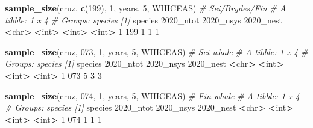 \documentclass[
]{book}
\newenvironment{Shaded}{\begin{snugshade}}{\end{snugshade}}
\newcommand{\AttributeTok}[1]{\textcolor[rgb]{0.13,0.29,0.53}{#1}}
\newcommand{\CommentTok}[1]{\textcolor[rgb]{0.56,0.35,0.01}{\textit{#1}}}
\newcommand{\DecValTok}[1]{\textcolor[rgb]{0.00,0.00,0.81}{#1}}
\newcommand{\ErrorTok}[1]{\textcolor[rgb]{0.64,0.00,0.00}{\textbf{#1}}}
\newcommand{\FunctionTok}[1]{\textcolor[rgb]{0.13,0.29,0.53}{\textbf{#1}}}
\newcommand{\NormalTok}[1]{#1}
\newcommand{\SpecialCharTok}[1]{\textcolor[rgb]{0.81,0.36,0.00}{\textbf{#1}}}
\newcommand{\StringTok}[1]{\textcolor[rgb]{0.31,0.60,0.02}{#1}}
\begin{document}
\begin{Shaded}
\begin{Highlighting}[]
\FunctionTok{sample\_size}\NormalTok{(cruz, }\FunctionTok{c}\NormalTok{(}\StringTok{\textquotesingle{}199\textquotesingle{}}\NormalTok{), }
            \DecValTok{1}\NormalTok{, years, }\DecValTok{5}\NormalTok{, }\StringTok{\textquotesingle{}WHICEAS\textquotesingle{}}\NormalTok{) }\CommentTok{\# Sei/Bryde\textquotesingle{}s/Fin}
\CommentTok{\# A tibble: 1 x 4}
\CommentTok{\# Groups:   species [1]}
\NormalTok{  species }\StringTok{\textasciigrave{}}\AttributeTok{2020\_ntot}\StringTok{\textasciigrave{}} \StringTok{\textasciigrave{}}\AttributeTok{2020\_nsys}\StringTok{\textasciigrave{}} \StringTok{\textasciigrave{}}\AttributeTok{2020\_nest}\StringTok{\textasciigrave{}}
  \SpecialCharTok{\textless{}}\NormalTok{chr}\SpecialCharTok{\textgreater{}}         \ErrorTok{\textless{}}\NormalTok{int}\SpecialCharTok{\textgreater{}}       \ErrorTok{\textless{}}\NormalTok{int}\SpecialCharTok{\textgreater{}}       \ErrorTok{\textless{}}\NormalTok{int}\SpecialCharTok{\textgreater{}}
\DecValTok{1} \DecValTok{199}               \DecValTok{1}           \DecValTok{1}           \DecValTok{1}

\FunctionTok{sample\_size}\NormalTok{(cruz, }\StringTok{\textquotesingle{}073\textquotesingle{}}\NormalTok{, }\DecValTok{1}\NormalTok{, years, }\DecValTok{5}\NormalTok{, }\StringTok{\textquotesingle{}WHICEAS\textquotesingle{}}\NormalTok{) }\CommentTok{\# Sei whale}
\CommentTok{\# A tibble: 1 x 4}
\CommentTok{\# Groups:   species [1]}
\NormalTok{  species }\StringTok{\textasciigrave{}}\AttributeTok{2020\_ntot}\StringTok{\textasciigrave{}} \StringTok{\textasciigrave{}}\AttributeTok{2020\_nsys}\StringTok{\textasciigrave{}} \StringTok{\textasciigrave{}}\AttributeTok{2020\_nest}\StringTok{\textasciigrave{}}
  \SpecialCharTok{\textless{}}\NormalTok{chr}\SpecialCharTok{\textgreater{}}         \ErrorTok{\textless{}}\NormalTok{int}\SpecialCharTok{\textgreater{}}       \ErrorTok{\textless{}}\NormalTok{int}\SpecialCharTok{\textgreater{}}       \ErrorTok{\textless{}}\NormalTok{int}\SpecialCharTok{\textgreater{}}
\DecValTok{1} \DecValTok{073}               \DecValTok{5}           \DecValTok{3}           \DecValTok{3}

\FunctionTok{sample\_size}\NormalTok{(cruz, }\StringTok{\textquotesingle{}074\textquotesingle{}}\NormalTok{, }\DecValTok{1}\NormalTok{, years, }\DecValTok{5}\NormalTok{, }\StringTok{\textquotesingle{}WHICEAS\textquotesingle{}}\NormalTok{) }\CommentTok{\# Fin whale}
\CommentTok{\# A tibble: 1 x 4}
\CommentTok{\# Groups:   species [1]}
\NormalTok{  species }\StringTok{\textasciigrave{}}\AttributeTok{2020\_ntot}\StringTok{\textasciigrave{}} \StringTok{\textasciigrave{}}\AttributeTok{2020\_nsys}\StringTok{\textasciigrave{}} \StringTok{\textasciigrave{}}\AttributeTok{2020\_nest}\StringTok{\textasciigrave{}}
  \SpecialCharTok{\textless{}}\NormalTok{chr}\SpecialCharTok{\textgreater{}}         \ErrorTok{\textless{}}\NormalTok{int}\SpecialCharTok{\textgreater{}}       \ErrorTok{\textless{}}\NormalTok{int}\SpecialCharTok{\textgreater{}}       \ErrorTok{\textless{}}\NormalTok{int}\SpecialCharTok{\textgreater{}}
\DecValTok{1} \DecValTok{074}               \DecValTok{1}           \DecValTok{1}           \DecValTok{1}


\end{Highlighting}
\end{Shaded}
\end{document}
